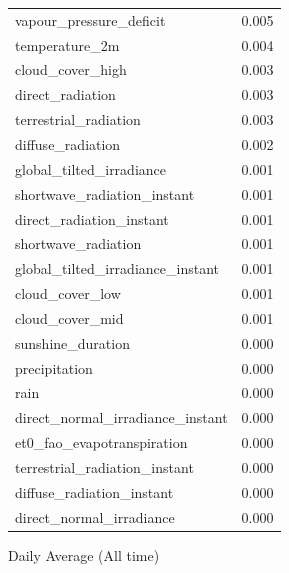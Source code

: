 \begin{table}[H]
\begin{tabular}{lc}
		vapour\_pressure\_deficit               & 0.005       \\ 
		temperature\_2m                         & 0.004       \\ 
		cloud\_cover\_high                      & 0.003       \\ 
		direct\_radiation                      & 0.003       \\ 
		terrestrial\_radiation                  & 0.003       \\ 
		diffuse\_radiation                      & 0.002       \\ 
		global\_tilted\_irradiance              & 0.001       \\ 
		shortwave\_radiation\_instant          & 0.001       \\ 
		direct\_radiation\_instant            & 0.001       \\ 
		shortwave\_radiation                   & 0.001       \\ 
		global\_tilted\_irradiance\_instant     & 0.001       \\ 
		cloud\_cover\_low                      & 0.001       \\ 
		cloud\_cover\_mid                      & 0.001       \\ 
		sunshine\_duration                     & 0.000       \\ 
		precipitation                          & 0.000       \\ 
		rain                                   & 0.000       \\ 
		direct\_normal\_irradiance\_instant    & 0.000       \\ 
		et0\_fao\_evapotranspiration          & 0.000       \\ 
		terrestrial\_radiation\_instant       & 0.000       \\ 
		diffuse\_radiation\_instant           & 0.000       \\ 
		direct\_normal\_irradiance            & 0.000       \\ 
	\end{tabular}
\end{table}

Daily Average (All time)

